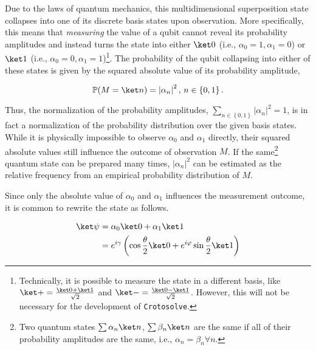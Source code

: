 Due to the laws of quantum mechanics, this multidimensional superposition state
collapses into one of its discrete basis states upon observation.
More specifically, this means that \emph{measuring} the value of a qubit cannot
reveal its probability amplitudes and instead turns the state into either
$\ket 0$ (i.e., $\alpha_0 = 1, \alpha_1 = 0$) or
$\ket 1$ (i.e., $\alpha_0 = 0, \alpha_1 = 1$)\footnote{
    Technically, it is possible to measure the state in a different basis, like
    $\ket + = \frac{\ket 0 + \ket 1}{\sqrt 2}$ and
    $\ket - = \frac{\ket 0 - \ket 1}{\sqrt 2}$.
    However, this will not be necessary for the development of
    \texttt{Crotosolve}.
}.
The probability of the qubit collapsing into either of these states is given by
the squared absolute value of its probability amplitude,

$$\mathbb P(M = \ket n) = \left| \alpha_n \right|^2,\, n \in \left\{0, 1\right\}.$$

Thus, the normalization of the probability amplitudes, 
$\sum_{n \in \left\{0, 1\right\}} \left|\alpha_n\right|^2 = 1$, is in fact a
normalization of the probability distribution over the given basis states.
While it is physically impossible to observe $\alpha_0$ and $\alpha_1$ directly,
their squared absolute values still influence the outcome of observation $M$.
If the same\footnote{
    Two quantum states $\sum \alpha_n \ket n$, $\sum \beta_n \ket n$ are the
    same if all of their probability amplitudes are the same,
    i.e., $\alpha_n = \beta_n \forall n$.
} quantum state can be prepared many times, $\left|\alpha_n\right|^2$ can be
estimated as the relative frequency from an empirical probability distribution
of $M$.

Since only the absolute value of $\alpha_0$ and $\alpha_1$ influences the
measurement outcome, it is common to rewrite the state as follows.

\begin{equation}
    \begin{split}
        \ket \psi
            &= \alpha_0 \ket 0 + \alpha_1 \ket 1\\
            &= e^{i\gamma} \left(\cos \frac\theta2 \ket 0 + e^{i\varphi} \sin \frac\theta2 \ket 1\right)
    \end{split}
\end{equation}

